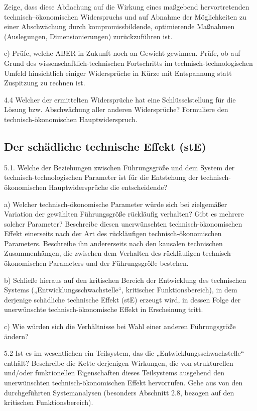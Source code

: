 \documentclass[12pt,a4paper]{article}
\begin{document}
Zeige, dass diese Abflachung auf die Wirkung eines maßgebend hervortretenden
technisch–ökonomischen Widerspruchs und auf Abnahme der Möglichkeiten zu einer
Abschwächung durch kompromissbildende, optimierende Maßnahmen (Auslegungen,
Dimensionierungen) zurückzuführen ist.

c) Prüfe, welche ABER in Zukunft noch an Gewicht gewinnen. Prüfe, ob auf Grund
des wissenschaftlich-technischen Fortschritts im technisch-technologischen
Umfeld hinsichtlich einiger Widersprüche in Kürze mit Entspannung statt
Zuspitzung zu rechnen ist.

4.4 Welcher der ermittelten Widersprüche hat eine Schlüsselstellung für die
Lösung bzw. Abschwächung aller anderen Widersprüche? Formuliere den
technisch-ökonomischen Hauptwiderspruch.

\subsection{Der schädliche technische Effekt (stE)}

5.1. Welche der Beziehungen zwischen Führungsgröße und dem System der
technisch-technologischen Parameter ist für die Entstehung der
technisch-ökonomischen Hauptwidersprüche die entscheidende?

a) Welcher technisch-ökonomische Parameter würde sich bei zielgemäßer Variation
der gewählten Führungsgröße rückläufig verhalten? Gibt es mehrere solcher
Parameter? Beschreibe diesen unerwünschten technisch-ökonomischen Effekt
einerseits nach der Art des rückläufigen technisch-ökonomischen
Parameters. Beschreibe ihn andererseits nach den kausalen technischen
Zusammenhängen, die zwischen dem Verhalten des rückläufigen
technisch-ökonomischen Parameters und der Führungsgröße bestehen.

b) Schließe hieraus auf den kritischen Bereich der Entwicklung des technischen
Systems („Entwicklungsschwachstelle“, kritischer Funktionsbereich), in dem
derjenige schädliche technische Effekt (stE) erzeugt wird, in dessen Folge der
unerwünschte technisch-ökonomische Effekt in Erscheinung tritt.

c) Wie würden sich die Verhältnisse bei Wahl einer anderen Führungsgröße
ändern?

5.2 Ist es im wesentlichen ein Teilsystem, das die „Entwicklungsschwachstelle“
enthält?  Beschreibe die Kette derjenigen Wirkungen, die von strukturellen
und/oder funktionellen Eigenschaften dieses Teilsystems ausgehend den
unerwünschten technisch-ökonomischen Effekt hervorrufen. Gehe aus von den
durchgeführten Systemanalysen (besonders Abschnitt 2.8, bezogen auf den
kritischen Funktionsbereich).
\end{document}
